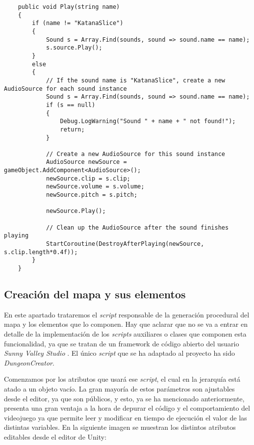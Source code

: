 \begin{lstlisting}
    public void Play(string name)
    {
        if (name != "KatanaSlice")
        {
            Sound s = Array.Find(sounds, sound => sound.name == name);
            s.source.Play();
        }
        else
        {
            // If the sound name is "KatanaSlice", create a new AudioSource for each sound instance
            Sound s = Array.Find(sounds, sound => sound.name == name);
            if (s == null)
            {
                Debug.LogWarning("Sound " + name + " not found!");
                return;
            }

            // Create a new AudioSource for this sound instance
            AudioSource newSource = gameObject.AddComponent<AudioSource>();
            newSource.clip = s.clip;
            newSource.volume = s.volume;
            newSource.pitch = s.pitch;

            newSource.Play();

            // Clean up the AudioSource after the sound finishes playing
            StartCoroutine(DestroyAfterPlaying(newSource, s.clip.length*0.4f));
        }
    }
\end{lstlisting}

\subsection{Creación del mapa y sus elementos}
\label{subsec:mapaYelementos}

En este apartado trataremos el \textit{script} responsable de la generación procedural del mapa y los elementos que lo componen. Hay que aclarar que no se va a entrar en detalle de la implementación de los \textit{scripts} auxiliares o clases que componen esta funcionalidad, ya que se tratan de un framework de código abierto del usuario \textit{Sunny Valley Studio} \cite{videosGeneracionProce}. El único \textit{script} que se ha adaptado al proyecto ha sido \textit{DungeonCreator}.

Comenzamos por los atributos que usará ese \textit{script}, el cual en la jerarquía está atado a un objeto vacío. La gran mayoría de estos parámetros son ajustables desde el editor, ya que son públicos, y esto, ya se ha mencionado anteriormente, presenta una gran ventaja a la hora de depurar el código y el comportamiento del videojuego ya que permite leer y modificar en tiempo de ejecución el valor de las distintas variables. En la siguiente imagen se muestran los distintos atributos editables desde el editor de Unity: 

